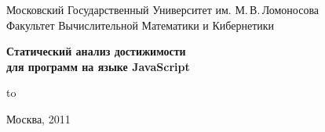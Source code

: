 %

{\centering
Московский Государственный Университет им. М.\,В.\,Ломоносова\\
Факультет Вычислительной Математики и Кибернетики
\par}

\vfill
{\centering\Large\bfseries
Статический анализ достижимости\\
для программ на языке JavaScript
\par}

\vfill
\hbox to 

\vfill
{\centering
Москва, 2011\par}



